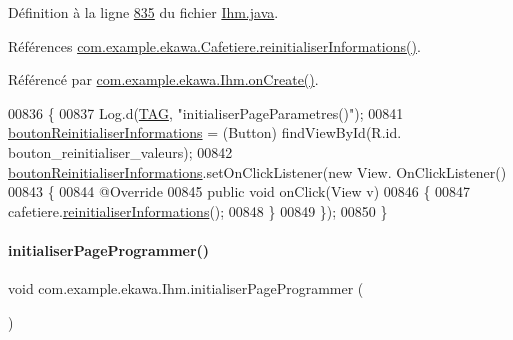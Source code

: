Définition à la ligne \hyperlink{_ihm_8java_source_l00835}{835} du fichier \hyperlink{_ihm_8java_source}{Ihm.\+java}.



Références \hyperlink{_cafetiere_8java_source_l00683}{com.\+example.\+ekawa.\+Cafetiere.\+reinitialiser\+Informations()}.



Référencé par \hyperlink{_ihm_8java_source_l00248}{com.\+example.\+ekawa.\+Ihm.\+on\+Create()}.


\begin{DoxyCode}
00836     \{
00837         Log.d(\hyperlink{classcom_1_1example_1_1ekawa_1_1_ihm_a95cd92c2acaf9f8982302da08d94f9aa}{TAG}, \textcolor{stringliteral}{"initialiserPageParametres()"});
00841         \hyperlink{classcom_1_1example_1_1ekawa_1_1_ihm_aa910a5ff04c7003b0035f89572310652}{boutonReinitialiserInformations} = (Button) findViewById(R.id.
      bouton\_reinitialiser\_valeurs);
00842         \hyperlink{classcom_1_1example_1_1ekawa_1_1_ihm_aa910a5ff04c7003b0035f89572310652}{boutonReinitialiserInformations}.setOnClickListener(\textcolor{keyword}{new} View.
      OnClickListener()
00843         \{
00844             @Override
00845             \textcolor{keyword}{public} \textcolor{keywordtype}{void} onClick(View v)
00846             \{
00847                 cafetiere.\hyperlink{classcom_1_1example_1_1ekawa_1_1_cafetiere_a18e77fd60191cc0b2c7e247f72807096}{reinitialiserInformations}();
00848             \}
00849         \});
00850     \}
\end{DoxyCode}
\mbox{\label{classcom_1_1example_1_1ekawa_1_1_ihm_aa5ef2c0c4b4cefb518ec4f3e05b098aa}} 
\paragraph{\texorpdfstring{initialiser\+Page\+Programmer()}{initialiserPageProgrammer()}}
{\footnotesize\ttfamily void com.\+example.\+ekawa.\+Ihm.\+initialiser\+Page\+Programmer (\begin{DoxyParamCaption}{ }\end{DoxyParamCaption})\hspace{0.3cm}{\ttfamily [private]}}



